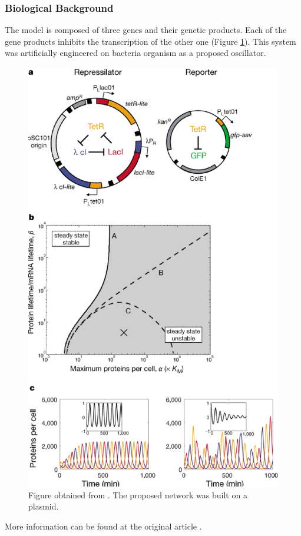 \documentclass[a4paper, 11pt]{article}
\begin{document}
  \subsubsection{Biological Background}
  The model is composed of three genes and their genetic products.
  Each of the gene products inhibits the transcription of the other one (Figure \ref{repressilator}).
  This system was artificially engineered on bacteria organism as a proposed oscillator.
  \begin{figure}[!t]
    \begin{center}
      \includegraphics[bb=5 670 310 980,clip,width=0.49\linewidth]{figures/plasmid.eps}
      \caption{Figure obtained from \cite{elowitz00}. The proposed network was built on a plasmid.\label{repressilator}}
    \end{center}
  \end{figure} 
  More information can be found at the original article \citep{elowitz00}.
\end{document}
